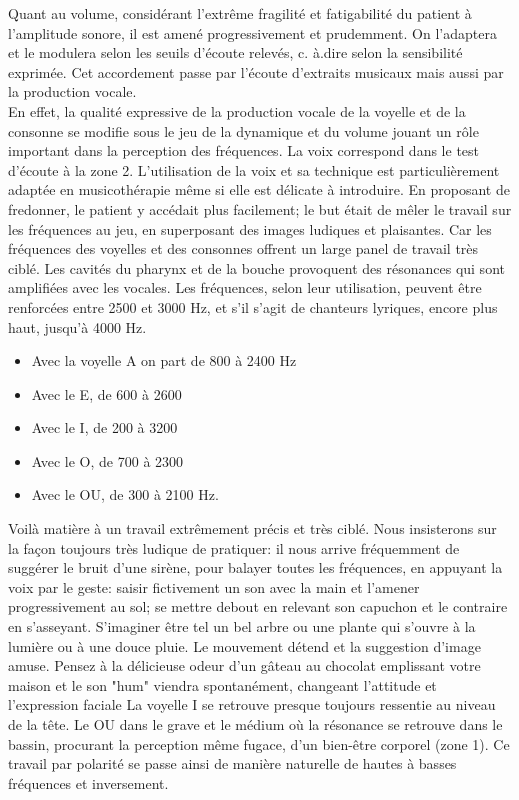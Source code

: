 Quant au volume, considérant l'extrême fragilité et fatigabilité du patient à l'amplitude sonore, 
il est amené progressivement et prudemment.
On l'adaptera et le modulera selon 
les seuils 
d'écoute relevés, c. à.dire selon la sensibilité exprimée.
Cet accordement passe par l'écoute d'extraits musicaux mais aussi par  la production vocale.
 \\
En effet, la qualité expressive de la production vocale de la voyelle et de la consonne se modifie sous le 
jeu de la 
dynamique et du volume  jouant  un rôle important dans la perception des fréquences.
La voix correspond dans le test d'écoute à la zone 2.  L'utilisation de la voix et sa 
technique est particulièrement adaptée en 
musicothérapie même si elle est délicate à  introduire. %
 En proposant de fredonner, le patient y accédait plus 
 facilement;  le but était de mêler le travail sur les fréquences au jeu, en superposant  des images 
 ludiques et plaisantes. Car les fréquences des voyelles et des consonnes offrent un large panel de 
 travail très ciblé. Les cavités du 
pharynx et de la bouche provoquent des résonances qui sont amplifiées avec les vocales. Les 
fréquences, selon leur utilisation, peuvent être renforcées entre 2500 et 3000 Hz, et s'il s'agit de 
chanteurs lyriques, encore plus haut, jusqu'à 4000 Hz. %
\autocite {Barraque} 
\begin{itemize}
	\item Avec la voyelle A on part de 800  à 2400 Hz
	\item Avec le  E, de 600 à 2600
	\item Avec le I, de 200 à 3200
	\item Avec le O, de 700 à 2300 
	\item Avec le OU, de 300 à 2100 Hz. 
\end{itemize}

Voilà matière à un travail extrêmement précis et très ciblé. 
Nous insisterons  sur la façon  toujours très ludique de pratiquer:  il nous arrive fréquemment 
de suggérer le bruit d'une sirène, pour balayer toutes les fréquences, en appuyant la voix par le geste: 
saisir fictivement un son avec la main et l'amener progressivement au sol;  se mettre debout en relevant 
son 
capuchon et le 
contraire en s'asseyant. S'imaginer être tel un bel 
arbre ou une plante qui s'ouvre à la lumière ou à une douce pluie.
Le mouvement détend et la suggestion d'image amuse. Pensez à la délicieuse odeur d'un gâteau au 
chocolat emplissant  votre maison et le son "hum" viendra spontanément, changeant l'attitude et 
l'expression faciale 
La voyelle I se retrouve presque toujours ressentie au niveau de la tête.
Le OU dans le grave et le médium où la résonance se retrouve dans le bassin, procurant la perception 
même fugace, d'un bien-être corporel (zone 1).
Ce travail par polarité se passe ainsi de manière naturelle de hautes à basses fréquences et inversement. 



